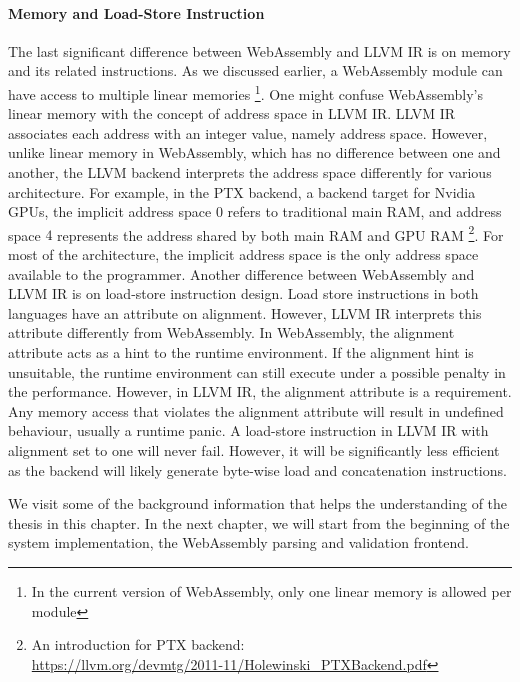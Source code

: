 \paragraph{Memory and Load-Store Instruction}
The last significant difference between WebAssembly and LLVM IR is on memory
and its related instructions. As we discussed earlier, a WebAssembly module can
have access to multiple linear memories \footnote{In the current version of
WebAssembly, only one linear memory is allowed per module}. One might confuse
WebAssembly's linear memory with the concept of address space in LLVM IR. LLVM
IR associates each address with an integer value, namely address space. However,
unlike linear memory in WebAssembly, which has no difference between one and
another, the LLVM backend interprets the address space differently for various
architecture. For example, in the PTX backend, a backend target for Nvidia GPUs,
the implicit address space $0$ refers to traditional main RAM, and address space
$4$ represents the address shared by both main RAM and GPU RAM 
\footnote{An introduction for PTX backend:
\\\url{https://llvm.org/devmtg/2011-11/Holewinski_PTXBackend.pdf}}. For most of
the architecture, the implicit address space is the only address space available
to the programmer.  Another difference between WebAssembly and LLVM IR is on
load-store instruction design. Load store instructions in both languages have an
attribute on alignment. However, LLVM IR interprets this attribute differently
from WebAssembly. In WebAssembly, the alignment attribute acts as a hint to the
runtime environment. If the alignment hint is unsuitable, the runtime
environment can still execute under a possible penalty in the performance.
However, in LLVM IR, the alignment attribute is a requirement. Any memory access
that violates the alignment attribute will result in undefined behaviour,
usually a runtime panic. A load-store instruction in LLVM IR with alignment set
to one will never fail. However, it will be significantly less efficient as the
backend will likely generate byte-wise load and concatenation instructions.


We visit some of the background information that helps the understanding of the
thesis in this chapter. In the next chapter, we will start from the beginning of
the system implementation, the WebAssembly parsing and validation frontend.